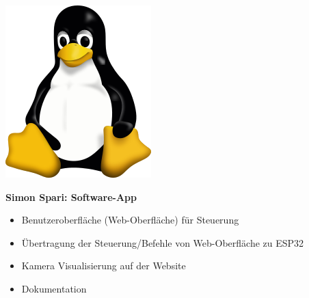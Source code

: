 \documentclass[ngerman,12pt,a4paper]{article}
\begin{document}
\begin{center}
			\begin{minipage}{0.18\textwidth}
				\includegraphics[width=\linewidth]{Pictures/spari}
				\label{fig:simon}
			\end{minipage}
			\hfill
			\begin{minipage}{0.65\textwidth}
				\vspace{-20pt}
				\textbf{Simon Spari: Software-App}
				\begin{itemize}
					\item Benutzeroberfläche (Web-Oberfläche) für Steuerung \vspace{-10pt}
					\item Übertragung der Steuerung/Befehle von Web-Oberfläche zu ESP32 \vspace{-10pt}
					\item Kamera Visualisierung auf der Website
					\item Dokumentation \vspace{-10pt}
				\end{itemize}
			\end{minipage} \\[1cm]

\end{center}
\end{document}
